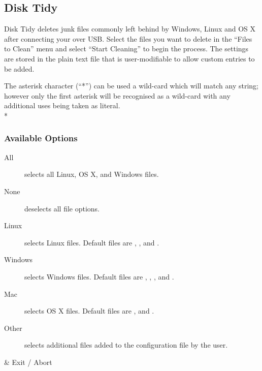 \subsection{Disk Tidy}
  Disk Tidy deletes junk files commonly left behind by Windows, Linux and
  OS X after connecting your \dap{} over USB. Select the files you want to
  delete in the ``Files to Clean'' menu and select ``Start Cleaning'' to begin
  the process. The settings are stored in the plain text file
   that is user-modifiable to allow
  custom entries to be added.
  
  The asterisk character (``*'') can be used a wild-card which will match any
  string; however only the first asterisk will be recognised as a wild-card 
  with any additional uses being taken as literal.\\*
  

  \subsubsection{Available Options}
  \begin{description}
    \item[All] selects all Linux, OS X, and Windows files.
    \item[None] deselects all file options.
    \item[Linux] selects Linux files. Default files are
      , , and .
    \item[Windows] selects Windows files. Default files are
      , , ,  and
      .
    \item[Mac] selects OS X files. Default files are ,  and
      .
    \item[Other] selects additional files added to the configuration file by the
                 user.
  \end{description}
  
  \begin{btnmap}
      \ActionStdCancel
      & Exit / Abort\\
  \end{btnmap}
